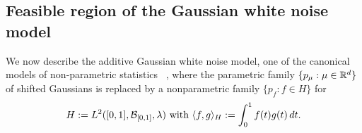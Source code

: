 \subsection{Feasible region of the Gaussian white noise model}
\vspace{-2mm}
We now describe the additive Gaussian white noise model, one of the canonical models of non-parametric statistics ~\citet{gine2016mathematical, johnstone2019gaussian, castillo2024bayesian}, where the parametric family $\{p_{\mu}: \mu\in \mathbb{R}^d\}$ of shifted Gaussians is replaced by a nonparametric family $\{p_f: f\in  H\}$ for  
\vspace{-2 mm}
\begin{equation}
H:= L^{2}([0,1], \cB_{[0,1]}, \lambda)
\text{ with }\langle f,g\rangle_{ H}:=\int_0^1 f(t)g(t)\,dt.
\vspace{-2 mm}
\end{equation}
\vspace{-2 mm}


